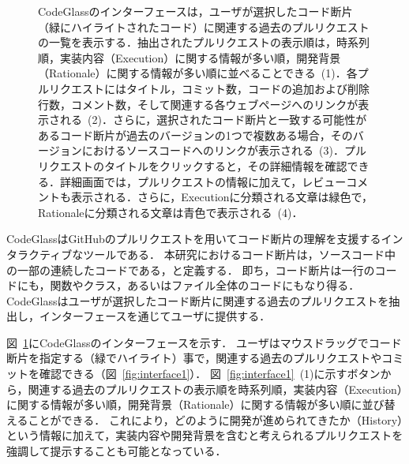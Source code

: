 \begin{figure}[t]
\begin{minipage}{0.49\textwidth}
\end{minipage}
	\caption{CodeGlassのインターフェースは，ユーザが選択したコード断片（緑にハイライトされたコード）に関連する過去のプルリクエストの一覧を表示する．抽出されたプルリクエストの表示順は，時系列順，実装内容（Execution）に関する情報が多い順，開発背景（Rationale）に関する情報が多い順に並べることできる~(1)．各プルリクエストにはタイトル，コミット数，コードの追加および削除行数，コメント数，そして関連する各ウェブページへのリンクが表示される~(2)．さらに，選択されたコード断片と一致する可能性があるコード断片が過去のバージョンの1つで複数ある場合，そのバージョンにおけるソースコードへのリンクが表示される~(3)．プルリクエストのタイトルをクリックすると，その詳細情報を確認できる．詳細画面では，プルリクエストの情報に加えて，レビューコメントも表示される．さらに，Executionに分類される文章は緑色で，Rationaleに分類される文章は青色で表示される~(4)．}
    \label{fig:WebInterface}
\end{figure}


CodeGlassはGitHubのプルリクエストを用いてコード断片の理解を支援するインタラクティブなツールである．
本研究におけるコード断片は，ソースコード中の一部の連続したコードである，と定義する．
即ち，コード断片は一行のコードにも，関数やクラス，あるいはファイル全体のコードにもなり得る．
CodeGlassはユーザが選択したコード断片に関連する過去のプルリクエストを抽出し，インターフェースを通じてユーザに提供する．




図~\ref{fig:WebInterface}にCodeGlassのインターフェースを示す．
ユーザはマウスドラッグでコード断片を指定する（緑でハイライト）事で，関連する過去のプルリクエストやコミットを確認できる（図~\ref{fig:interface1}）．
図~\ref{fig:interface1}~(1)に示すボタンから，関連する過去のプルリクエストの表示順を時系列順，実装内容（Execution）に関する情報が多い順，開発背景（Rationale）に関する情報が多い順に並び替えることができる．
これにより，どのように開発が進められてきたか（History）という情報に加えて，実装内容や開発背景を含むと考えられるプルリクエストを強調して提示することも可能となっている．

